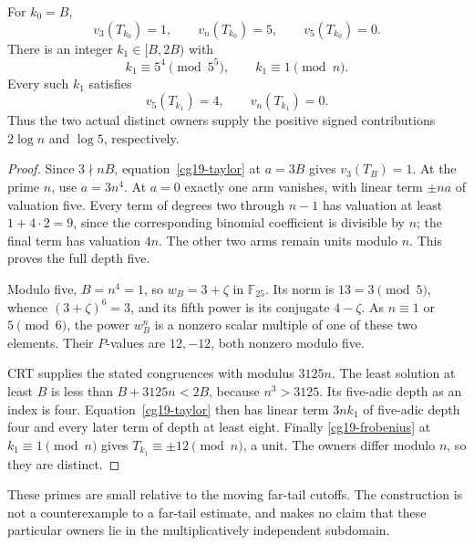 \begin{proposition}
\label{cg19-owners}
For \(k_0=B\),
\[
 v_3(T_{k_0})=1,\qquad v_n(T_{k_0})=5,\qquad v_5(T_{k_0})=0.
\]
There is an integer \(k_1\in[B,2B)\) with
\[
 k_1\equiv5^4\pmod{5^5},\qquad k_1\equiv1\pmod n.
\]
Every such \(k_1\) satisfies
\[
 v_5(T_{k_1})=4,\qquad v_n(T_{k_1})=0.
\]
Thus the two actual distinct owners supply the positive signed
contributions \(2\log n\) and \(\log5\), respectively.
\end{proposition}
\begin{proof}
Since \(3\nmid nB\), equation~\eqref{cg19-taylor} at \(a=3B\)
gives \(v_3(T_B)=1\). At the prime \(n\), use \(a=3n^4\).
At \(a=0\) exactly one arm vanishes, with linear term \(\pm na\)
of valuation five. Every term of degrees two through \(n-1\)
has valuation at least \(1+4\cdot2=9\), since the corresponding
binomial coefficient is divisible by \(n\); the final term has
valuation \(4n\). The other two arms remain units modulo \(n\).
This proves the full depth five.

Modulo five, \(B=n^4=1\), so \(w_B=3+\zeta\) in \(\mathbb F_{25}\).
Its norm is \(13=3\pmod5\), whence \((3+\zeta)^6=3\), and
its fifth power is its conjugate \(4-\zeta\).
As \(n\equiv1\) or \(5\pmod6\), the power \(w_B^n\) is a nonzero
scalar multiple of one of these two elements. Their \(P\)-values
are \(12,-12\), both nonzero modulo five.

CRT supplies the stated congruences with modulus \(3125n\).
The least solution at least \(B\) is less than \(B+3125n<2B\),
because \(n^3>3125\). Its five-adic depth as an index is four.
Equation~\eqref{cg19-taylor} then has linear term \(3nk_1\)
of five-adic depth four and every later term of depth at least
eight. Finally \eqref{cg19-frobenius} at \(k_1\equiv1\pmod n\)
gives \(T_{k_1}\equiv\pm12\pmod n\), a unit.
The owners differ modulo \(n\), so they are distinct.
\end{proof}

These primes are small relative to the moving far-tail cutoffs.
The construction is not a counterexample to a far-tail estimate,
and makes no claim that these particular owners lie in the
multiplicatively independent subdomain.


